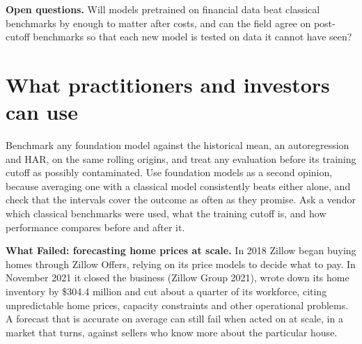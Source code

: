 \label{sec:21-open}
\textbf{Open questions.} Will models pretrained on financial data beat classical benchmarks by enough to matter after costs, and can the field agree on post-cutoff benchmarks so that each new model is tested on data it cannot have seen?

\section{What practitioners and investors can use}
\label{sec:21-investors}

Benchmark any foundation model against the historical mean, an autoregression and HAR, on the same rolling origins, and treat any evaluation before its training cutoff as possibly contaminated. Use foundation models as a second opinion, because averaging one with a classical model consistently beats either alone, and check that the intervals cover the outcome as often as they promise. Ask a vendor which classical benchmarks were used, what the training cutoff is, and how performance compares before and after it.

\begin{callout}
\textbf{What Failed: forecasting home prices at scale.} In 2018 Zillow began buying homes through Zillow Offers, relying on its price models to decide what to pay. In November 2021 it closed the business (Zillow Group 2021), wrote down its home inventory by \$304.4 million and cut about a quarter of its workforce, citing unpredictable home prices, capacity constraints and other operational problems. A forecast that is accurate on average can still fail when acted on at scale, in a market that turns, against sellers who know more about the particular house.
\end{callout}

\makeatletter
{}
\makeatother

